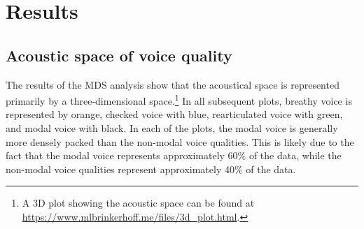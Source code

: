 
\section{Results} \label{sec:acousticlandscape:results}
\subsection{Acoustic space of voice quality} \label{sec:acousticlandscape:space}

The results of the MDS analysis show that the acoustical space is represented primarily by a three-dimensional space.\footnote{A 3D plot showing the acoustic space can be found at \href{https://www.mlbrinkerhoff.me/files/3d_plot.html}{https://www.mlbrinkerhoff.me/files/3d_plot.html}.} In all subsequent plots, breathy voice is represented by orange, checked voice with blue, rearticulated voice with green, and modal voice with black. In each of the plots, the modal voice is generally more densely packed than the non-modal voice qualities. This is likely due to the fact that the modal voice represents approximately 60\% of the data, while the non-modal voice qualities represent approximately 40\% of the data. 


